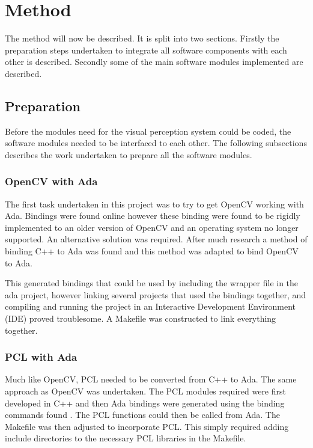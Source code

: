 \section{Method}\label{sec:method}
The method will now be described. It is split into two sections. Firstly the preparation steps undertaken to integrate all software components with each other is described. Secondly some of the main software modules implemented are described.
\subsection{Preparation}
Before the modules need for the visual perception system could be coded, the software modules needed to be interfaced to each other. The following subsections describes the work undertaken to prepare all the software modules.
\subsubsection{OpenCV with Ada}
The first task undertaken in this project was to try to get OpenCV working with Ada. Bindings were found online \cite{web:oldAdaBindings} however these binding were found to be rigidly implemented to an older version of OpenCV and an operating system no longer supported. An alternative solution was required. After much research a method of binding C++ to Ada was found \cite{web:newAdaBindings} and this method was adapted to bind OpenCV to Ada.

This generated bindings that could be used by including the wrapper file in the ada project, however linking several projects that used the bindings together, and compiling and running the project in an Interactive Development Environment (IDE) proved troublesome. A Makefile was constructed to link everything together.

\subsubsection{PCL with Ada}
Much like OpenCV, PCL needed to be converted from C++ to Ada. The same approach as OpenCV was undertaken. The PCL modules required were first developed in C++ and then Ada bindings were generated using the binding commands found \cite{web:newAdaBindings}. The PCL functions could then be called from Ada. The Makefile was then adjusted to incorporate PCL. This simply required adding include directories to the necessary PCL libraries in the Makefile. 

